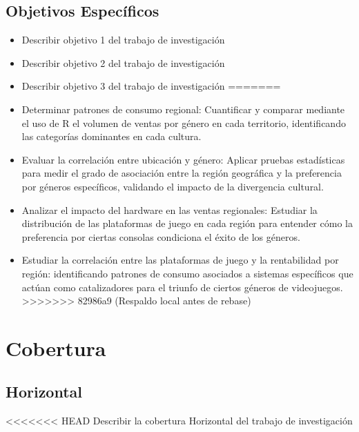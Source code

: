 \documentclass[oneside,11pt]{Latex/Classes/PhDthesisPSnPDF}
\begin{document}
\subsection{Objetivos Específicos}
\begin{itemize}
<<<<<<< HEAD
  \item{Describir objetivo 1 del trabajo de investigación}
  \item{Describir objetivo 2 del trabajo de investigación}
  \item{Describir objetivo 3 del trabajo de investigación}
=======
  \item{Determinar patrones de consumo regional: Cuantificar y comparar mediante el uso de R el volumen de ventas por género en cada territorio, identificando las categorías dominantes en cada cultura.}
  \item{Evaluar la correlación entre ubicación y género: Aplicar pruebas estadísticas para medir el grado de asociación entre la región geográfica y la preferencia por géneros específicos, validando el impacto de la divergencia cultural.}
  \item{Analizar el impacto del hardware en las ventas regionales: Estudiar la distribución de las plataformas de juego en cada región para entender cómo la preferencia por ciertas consolas condiciona el éxito de los géneros.}
  \item{Estudiar la correlación entre las plataformas de juego y la rentabilidad por región: identificando patrones de consumo asociados a sistemas específicos que actúan como catalizadores para el triunfo de ciertos géneros de videojuegos.}
>>>>>>> 82986a9 (Respaldo local antes de rebase)
\end{itemize}

\section{Cobertura}

\subsection{Horizontal}

<<<<<<< HEAD
Describir la cobertura Horizontal del trabajo de investigación\\
\end{document}
